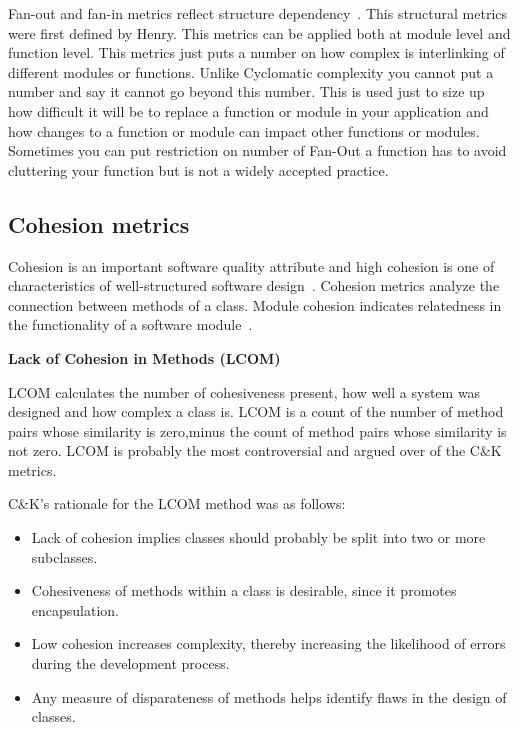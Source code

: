 Fan-out and fan-in metrics reflect structure dependency~\cite{fanin}.
This structural metrics were first defined by Henry.
This metrics can be applied both at module level and function level. This metrics just puts a number on how complex is interlinking of different modules or functions. Unlike Cyclomatic complexity you cannot put a number and say it cannot go beyond this number. This is used just to size up how
difficult it will be to replace a function or module in your application and how changes to a function or module can impact other functions or modules. Sometimes you can put restriction on number of Fan-Out a function has to avoid cluttering your function but is not a widely accepted practice.


\subsection{Cohesion metrics}
Cohesion is an important software quality attribute and high cohesion is one of characteristics of well-structured software design~\cite{cohesion}.
Cohesion metrics analyze the connection between methods of a class.
Module cohesion indicates relatedness in the functionality of a software module~\cite{cohesion2}.

\textbf{Lack of Cohesion in Methods (LCOM)}

LCOM calculates the number of cohesiveness present, how well a system was designed and how complex a class is. LCOM is a count of the number of method pairs whose similarity is zero,minus the count of method pairs whose similarity is not zero. LCOM is probably the most controversial and argued over of the C\&K metrics.

C\&K's rationale for the LCOM method was as follows:
\begin{itemize}
	\item Lack of cohesion implies classes should probably be split into two or more subclasses.
	\item Cohesiveness of methods within a class is desirable, since it promotes encapsulation.
	\item Low cohesion increases complexity, thereby increasing the likelihood of errors during the development process.
	\item Any measure of disparateness of methods helps identify flaws in the design of classes. 
\end{itemize}

